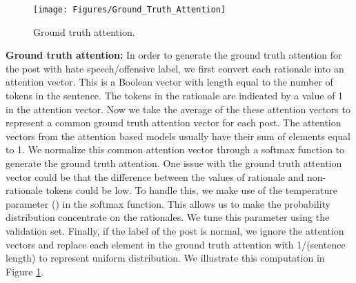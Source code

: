 \documentclass[letterpaper]{article} \usepackage{aaai21}  \usepackage{times}  \usepackage{helvet} \usepackage{courier}  \usepackage[hyphens]{url}  \usepackage{graphicx} \urlstyle{rm} \def\UrlFont{\rm}  \usepackage{natbib}  \usepackage{caption}
\begin{document}
\begin{figure}[t]
    \centering
    \texttt{[image: Figures/Ground\_Truth\_Attention]}
    \caption{Ground truth attention.}
    \label{fig:ground_truth_attention}
\end{figure}

\noindent\textbf{Ground truth attention:} In order to generate the ground truth attention for the post with hate speech/offensive label, we first convert each rationale into an attention vector. This is a Boolean vector with length equal to the number of tokens in the sentence. The tokens in the rationale are indicated by a value of 1 in the attention vector. Now we take the average of the these attention vectors to represent a common ground truth attention vector for each post. The attention vectors from the attention based models usually have their sum of elements equal to 1. We normalize this common attention vector through a softmax function to generate the ground truth attention. One issue with the ground truth attention vector could be that the difference between the values of rationale and non-rationale tokens could be low. To handle this, we make use of the temperature parameter () in the softmax function. This allows us to make the probability distribution concentrate on the rationales. We tune this parameter using the validation set.
Finally, if the label of the post is normal, we ignore the attention vectors and replace each element in the ground truth attention with 1/(sentence length) to represent uniform distribution. We illustrate this computation in Figure \ref{fig:ground_truth_attention}.
\end{document}

